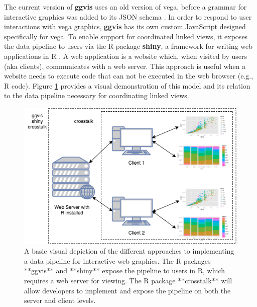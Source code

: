 \documentclass[11pt]{isuthesis}
\begin{document}
The current version of \textbf{ggvis} uses an old version of vega,
before a grammar for interactive graphics was added to its JSON schema
\citep{vega-lite}. In order to respond to user interactions with vega
graphics, \textbf{ggvis} has its own custom JavaScript designed
specifically for vega. To enable support for coordinated linked views,
it exposes the data pipeline to users via the R package \textbf{shiny},
a framework for writing web applications in R \citep{shiny}. A web
application is a website which, when visited by users (aka clients),
communicates with a web server. This approach is useful when a website
needs to execute code that can not be executed in the web browser (e.g.,
R code). Figure \ref{fig:server-client} provides a visual demonstration
of this model and its relation to the data pipeline necessary for
coordinating linked views.

\begin{figure}

{\centering \includegraphics{diagrams/server-client} 

}

\caption{A basic visual depiction of the different approaches to implementing a data pipeline for interactive web graphics. The R packages **ggvis** and **shiny** expose the pipeline to users in R, which requires a web server for viewing. The R package **crosstalk** will allow developers to implement and expose the pipeline on both the server and client levels.}\label{fig:server-client}
\end{figure}
\end{document}
